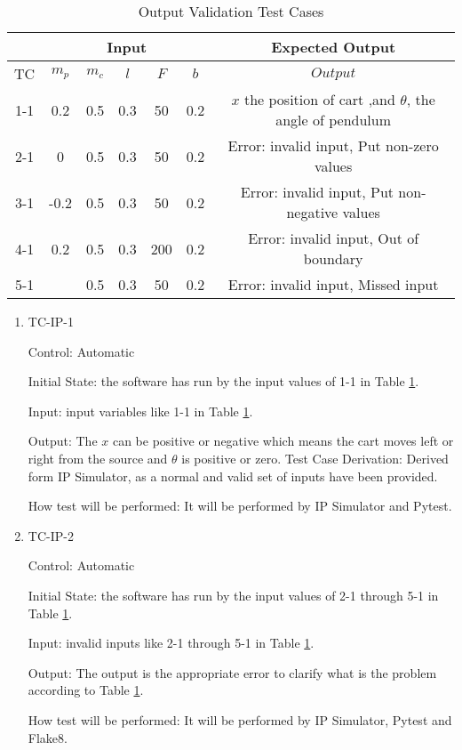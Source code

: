 \documentclass[12pt, titlepage]{article}
\begin{document}
\begin{table}
 \begin{tabular}{|c|c c c c c| c|} 
 \hline
 \multicolumn{1}{l|}{}   & \multicolumn{5}{c|}{Input}                            & \multicolumn{1}{c}{Expected Output} \\ \hline
\hline
\multicolumn{1}{c|}{TC} &   $m_p$ & $m_c$ & $l$ & $F$ & $b$  &   $Output$ \\ \hline
1-1 &0.2 & 0.5& 0.3& 50& 0.2 &$x$ the position of cart ,and $\theta$, the angle of pendulum \\
 \hline
2-1 &0 & 0.5& 0.3& 50& 0.2 & Error: invalid input, Put non-zero values  \\
 \hline
3-1 &-0.2 & 0.5& 0.3& 50& 0.2& Error: invalid input, Put non-negative values\\
 \hline
4-1 & 0.2& 0.5& 0.3& 200& 0.2 & Error: invalid input, Out of boundary \\
 \hline
5-1 & & 0.5& 0.3& 50& 0.2 & Error: invalid input, Missed input \\
  \hline
\end{tabular}
\caption{\label{tbl_outValidation}Output Validation Test Cases}
\end{table}		

\begin{enumerate}

\item{TC-IP-1}

Control: Automatic
					
Initial State: the software has run by the input values of 1-1 in Table \ref{tbl_outValidation}.
					
Input: input variables like 1-1 in Table \ref{tbl_outValidation}.
					
Output: The $x$ can be positive or negative which means the cart moves left or right from the source and $\theta$ is positive or zero.
Test Case Derivation: Derived form IP Simulator, as a normal and valid set of inputs have been provided.
					
How test will be performed: It will be performed by IP Simulator and Pytest.

\item{TC-IP-2}

Control: Automatic
					
Initial State: the software has run by the input values of 2-1 through 5-1 in Table \ref{tbl_outValidation}.
					
Input: invalid inputs like 2-1 through 5-1 in Table \ref{tbl_outValidation}.
					
Output: The output is the appropriate error to clarify what is the problem according to Table \ref{tbl_outValidation}.
					
How test will be performed:  It will be performed by IP Simulator, Pytest and Flake8.
				

\end{enumerate}
\end{document}
